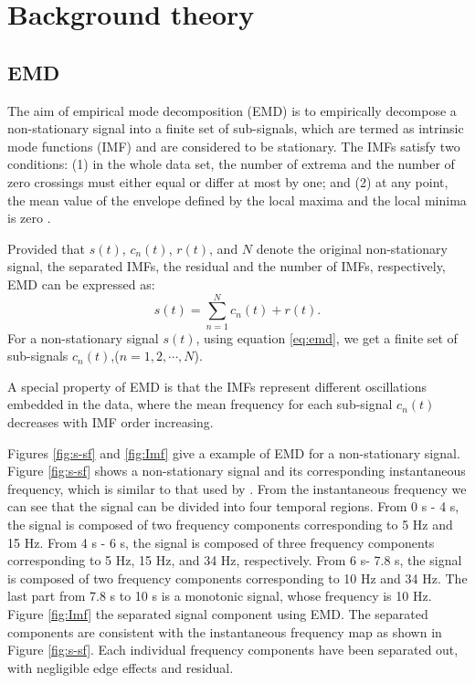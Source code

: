 \section{Background theory}
\subsection{EMD}
The aim of empirical mode decomposition (EMD) is to empirically decompose a non-stationary signal into a finite set of sub-signals, which are termed as intrinsic mode functions (IMF) and are considered to be stationary. The IMFs satisfy two conditions: (1) in the whole data set, the number of extrema and the number of zero crossings must either  equal or differ at most by one; and (2) at any point, the mean value of the envelope defined by the local maxima and  the local minima is  zero \cite[]{emd}.

Provided that $s(t)$, $c_n(t)$, $r(t)$, and $N$ denote the original non-stationary signal, the separated IMFs, the residual and the number of IMFs, respectively, EMD can be expressed as:
\begin{equation}
\label{eq:emd}
s(t)=\sum_{n=1}^{N}c_n(t)+r(t).
\end{equation}
For a non-stationary signal $s(t)$, using equation \ref{eq:emd}, we get a finite set of sub-signals $c_n(t)$,($n=1,2,\cdots,N$). 

A special property of EMD is that the IMFs represent different oscillations embedded in the data, where the mean frequency for each sub-signal $c_n(t)$ decreases with IMF order increasing. 

Figures \ref{fig:s-sf} and \ref{fig:Imf} give a example of EMD for a non-stationary signal. Figure \ref{fig:s-sf} shows a non-stationary signal and its corresponding instantaneous frequency, which is similar to that used by \cite{herrera2013}. From the instantaneous frequency we can see that the signal can be divided into four temporal regions. From 0 s - 4 s, the signal is composed of two frequency components corresponding to 5 Hz and 15 Hz. From 4 s - 6 s, the signal is composed of three frequency components corresponding to 5 Hz, 15 Hz, and 34 Hz, respectively. From 6 s- 7.8 s, the signal is composed of two frequency components corresponding to 10 Hz and 34 Hz. The last part from 7.8 s to 10 s is a monotonic signal, whose frequency is 10 Hz. Figure \ref{fig:Imf}  the separated signal component using EMD. The separated components are consistent with the instantaneous frequency map as shown in Figure \ref{fig:s-sf}. Each individual frequency components have been separated out, with negligible edge effects and residual.

